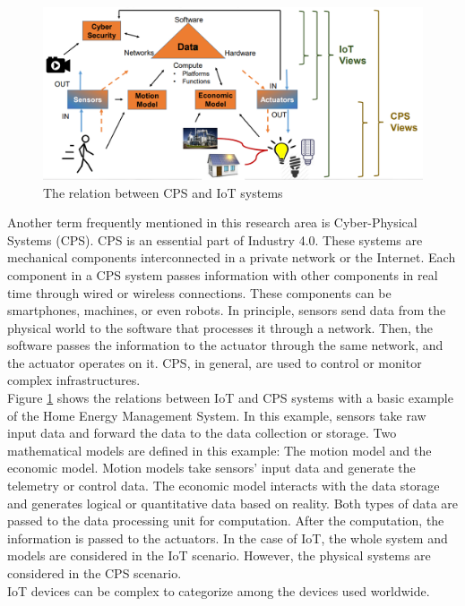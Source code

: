 \documentclass[12pt,a4paper]{article}
\begin{document}
\begin{figure}[H]
\centering
\includegraphics[scale=0.5]{iot_cps.PNG}
\caption{The relation between CPS and IoT systems \cite{r16}}
\label{iot_cps}
\end{figure}

Another term frequently mentioned in this research area is Cyber-Physical Systems (CPS). CPS is an essential part of Industry 4.0. These systems are mechanical components interconnected in a private network or the Internet. Each component in a CPS system passes information with other components in real time through wired or wireless connections. These components can be smartphones, machines, or even robots. In principle, sensors send data from the physical world to the software that processes it through a network. Then, the software passes the information to the actuator through the same network, and the actuator operates on it. CPS, in general, are used to control or monitor complex infrastructures. \cite{r12} \\ 

Figure \ref{iot_cps} shows the relations between IoT and CPS systems with a basic example of the Home Energy Management System. In this example, sensors take raw input data and forward the data to the data collection or storage. Two mathematical models are defined in this example: The motion model and the economic model. Motion models take sensors' input data and generate the telemetry or control data. The economic model interacts with the data storage and generates logical or quantitative data based on reality. Both types of data are passed to the data processing unit for computation. After the computation, the information is passed to the actuators. In the case of IoT, the whole system and models are considered in the IoT scenario. However, the physical systems are considered in the CPS scenario. \cite{r16} \\

IoT devices can be complex to categorize among the devices used worldwide.
\end{document}
